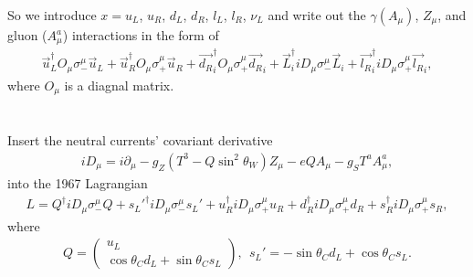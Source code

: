 \documentclass[11pt]{article}
\def\del{{\partial}}
\begin{document}
So we introduce $x=u_L$, $u_R$, $d_L$, $d_R$, $l_L$, $l_R$, $\nu_L$ and write out the $\gamma (A_\mu)$, $Z_\mu$, and gluon ($A^a_\mu$) interactions in the form of 
\begin{eqnarray}
    \vec{u}^\dagger_L O_\mu \sigma_-^\mu \vec{u}_L + \vec{u}^\dagger_R O_\mu \sigma_+^\mu \vec{u}_R  + \vec{d_R}_i^\dagger O_\mu \sigma_+^\mu \vec{d_R}_i
    +  \vec{L}_i^\dagger iD_\mu \sigma_-^\mu \vec{L}_i
    + \vec{l_R}_i^\dagger iD_\mu \sigma_+^\mu \vec{l_R}_i,
\end{eqnarray}
where $O_\mu$ is a diagnal matrix. 

\section{ }
Insert the neutral currents' covariant derivative
\begin{eqnarray}
  iD_\mu = i\del_\mu -g_Z (T^3-Q\sin^2\theta_W) Z_\mu -e Q A_\mu -g_S T^a A^a_\mu,
\end{eqnarray}
into the 1967 Lagrangian
\begin{eqnarray}
    L =  Q^\dagger  iD_\mu \sigma_-^\mu Q
    + {s_L'}^\dagger iD_\mu \sigma_-^\mu s_L'
    + u_R^\dagger  iD_\mu \sigma_+^\mu u_R
    + d_R^\dagger  iD_\mu \sigma_+^\mu d_R
    + s_R^\dagger  iD_\mu \sigma_+^\mu s_R,
\end{eqnarray}
where
\begin{eqnarray}
    Q=
    \begin{pmatrix}
        u_L \\ \cos\theta_C d_L + \sin\theta_C s_L
    \end{pmatrix}, ~~
    s_L' = -\sin\theta_C d_L + \cos\theta_C s_L.
\end{eqnarray}
\end{document}
